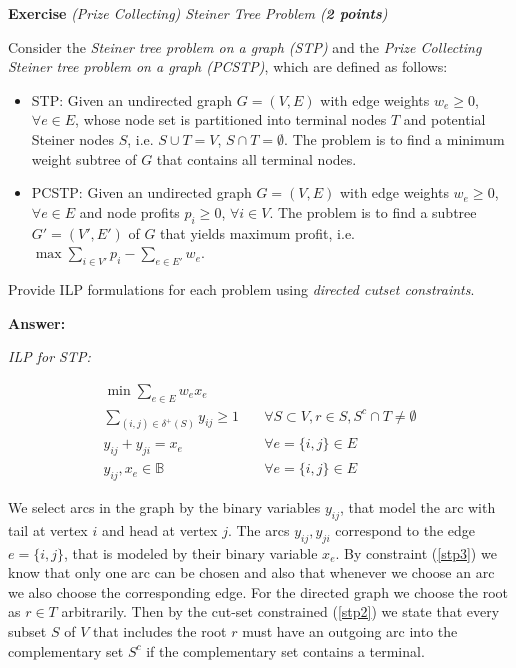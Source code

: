 \documentclass[a4paper,10pt]{article}
\newcounter{exc}
\newenvironment{exercise}[1]%
{\refstepcounter{exc}\textbf{Exercise \arabic{exc}} \emph{#1}\\}
{

\hrulefill\medskip}%
\begin{document}
\begin{exercise}{(Prize Collecting) Steiner Tree Problem (\textbf{2 points})}\label{ex:steinertrees}

Consider the \emph{Steiner tree problem on a graph (STP)} and the \emph{Prize Collecting Steiner tree problem on a graph (PCSTP)}, which are defined as follows:

\begin{itemize}
\item STP: Given an undirected graph $G=(V,E)$ with edge weights $w_e\ge 0$, $\forall e\in E$, whose node set is partitioned into terminal nodes $T$ and potential Steiner nodes $S$, i.e. $S\cup T=V$, $S\cap T=\emptyset$. The problem is to find a minimum weight subtree of $G$ that contains all terminal nodes.

\item PCSTP: Given an undirected graph $G=(V,E)$ with edge weights $w_e\ge 0$, $\forall e\in E$ and node profits $p_i\ge 0$, $\forall i\in V$.
The problem is to find a subtree $G'=(V',E')$ of $G$ that yields maximum profit, i.e. $\max \sum_{i\in V'} p_i - \sum_{e\in E'} w_e$.
\end{itemize}

Provide ILP formulations for each problem using \emph{directed cutset constraints}.

\textbf{Answer:}

\emph{ILP for STP:}

\begin{align}
\label{stp1}
\min\sum\limits_{e\in E} w_e x_e & \\
\label{stp2}
\sum\limits_{(i,j)\in\delta^+(S)} y_{ij}\geq 1 & \quad\forall S\subset V, r\in S, S^c \cap T \neq \emptyset \\
\label{stp3}
y_{ij}+y_{ji} = x_e & \quad \forall e=\{i,j\}\in E \\
\label{stp4}
y_{ij}, x_e\in \mathbb{B}& \quad \forall e=\{i,j\}\in E
\end{align}

We select arcs in the graph by the binary variables $y_{ij}$, that model the arc with tail at vertex $i$ and head at vertex $j$. The arcs $y_{ij},y_{ji}$ correspond to the edge $e=\{i,j\}$, that is modeled by their binary variable $x_e$. By constraint (\ref{stp3}) we know that only one arc can be chosen and also that whenever we choose an arc we also choose the corresponding edge. For the directed graph we choose the root as $r\in T$ arbitrarily. Then by the cut-set constrained (\ref{stp2}) we state that every subset $S$ of $V$ that includes the root $r$ must have an outgoing arc into the complementary set $S^c$ if the complementary set contains a terminal.



\end{exercise}
\end{document}
